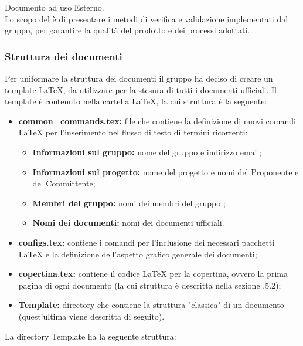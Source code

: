         Documento ad uso Esterno.\\
        Lo scopo del \textit{\PdQ{}} è di presentare i metodi di verifica e validazione implementati dal gruppo, per garantire la qualità del prodotto e dei processi adottati.

    \subsubsection{Struttura dei documenti}
        Per uniformare la struttura dei documenti il gruppo ha deciso di creare un template \LaTeX{}, da utilizzare per la stesura di tutti i documenti ufficiali. Il template è contenuto nella cartella \LaTeX{}, la cui struttura è la seguente:
        \begin{itemize}
          \item \textbf{common\_commands.tex:} file che contiene la definizione di nuovi comandi \LaTeX{} per l'inserimento nel flusso di testo di termini ricorrenti:
            \begin{itemize}
              \item \textbf{Informazioni sul gruppo:} nome del gruppo e indirizzo email;
              \item \textbf{Informazioni sul progetto:} nome del progetto e nomi del Proponente e del Committente;
              \item \textbf{Membri del gruppo:} nomi dei membri del gruppo \Gruppo;
              \item \textbf{Nomi dei documenti:} nomi dei documenti ufficiali.
            \end{itemize}
          \item \textbf{configs.tex:} contiene i comandi per l'inclusione dei necessari pacchetti \LaTeX{} e la definizione dell'aspetto grafico generale dei documenti;
          \item \textbf{copertina.tex:} contiene il codice \LaTeX{} per la copertina, ovvero la prima pagina di ogni documento (la cui struttura è descritta nella sezione .5.2);
          \item \textbf{Template:} directory che contiene la struttura "classica" di un documento (quest'ultima viene descritta di seguito).
        \end{itemize}
        La directory Template ha la seguente struttura:
